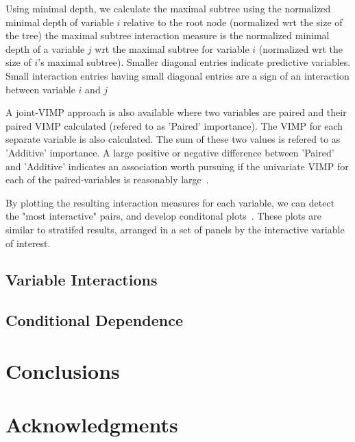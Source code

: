 \documentclass[nojss]{jss}\usepackage[]{graphicx}\usepackage[]{color}
\begin{document}
Using minimal depth, we calculate the maximal subtree using the normalized minimal depth of variable $i$ relative to the root node (normalized wrt the size of the tree) the maximal subtree interaction measure  is the normalized minimal depth of a variable $j$ wrt the maximal subtree for variable $i$ (normalized wrt the size of $i$'s maximal subtree). Smaller diagonal entries indicate predictive variables. Small interaction entries having small diagonal entries are a sign of an interaction between variable $i$ and $j$~\citep{Ishwaran_HighDimension:2010,Ishwaran_HighDimension:2011} 

A joint-VIMP approach is also available where two variables are paired and their paired VIMP calculated (refered to as 'Paired' importance). The VIMP for each separate variable is also calculated. The sum of these two values is refered to as 'Additive' importance. A large positive or negative difference between 'Paired' and 'Additive' indicates an association worth pursuing if the univariate VIMP for each of the paired-variables is reasonably large~\citep{Ishwaran:2007}.

By plotting the resulting interaction measures for each variable, we can detect the "most interactive" pairs, and develop conditonal plots~\cite{}. These plots are similar to stratifed results, arranged in a set of panels by the interactive variable of interest. 


\subsection{Variable Interactions}


\subsection{Conditional Dependence}

\section{Conclusions} \label{S:conclusion}


\section{Acknowledgments} \label{S:acknowledge}



\end{document}
